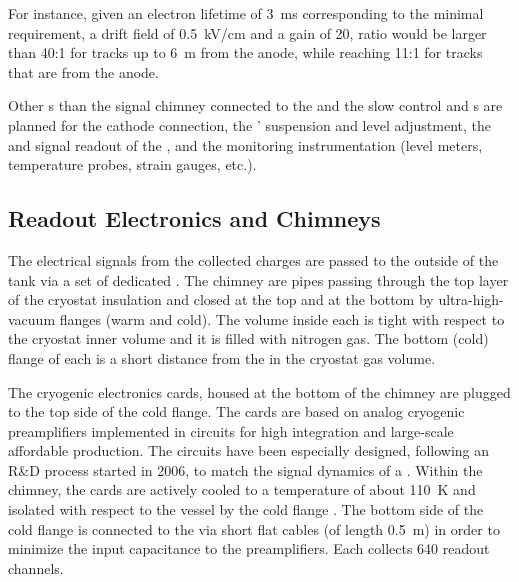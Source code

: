 For instance, given an electron lifetime of \SI{3}{ms} corresponding to the minimal requirement,  a drift field of \SI{0.5}{kV/cm} and a  gain of \num{20},  ratio would be larger than  \num{40}:\num{1} for tracks up to \SI{6}{m} from the anode, while reaching  \num{11}:\num{1} for   tracks that are \dpmaxdrift from the anode.


Other \fdth{}s than the signal chimney connected to the  and the  slow control and \fdth{}s are planned for the cathode  connection, the ' suspension and level adjustment, the  and signal readout of the , and the monitoring instrumentation (level meters, temperature probes, strain gauges, etc.).

\subsection{Readout Electronics and Chimneys}
\label{v4:fddp-ov:electronics}

The electrical signals from the collected charges are passed to the outside of the tank via a set of dedicated . The chimney are pipes passing through the top layer of the cryostat insulation and closed at the top and at the bottom by ultra-high-vacuum flanges (warm and cold). The volume inside each  is tight with respect to the cryostat inner volume and it is filled with nitrogen gas. The bottom (cold) flange of each  is a short distance %
from the  in the cryostat gas volume.

The cryogenic  electronics cards, housed at the bottom of the chimney are plugged to the top side of  the cold flange. The  cards are based on analog cryogenic preamplifiers implemented in   circuits for high integration and large-scale affordable production. 
The  circuits have been especially designed, following an R\&D process started in 2006, to match the signal dynamics of a . Within the chimney, the cards are actively cooled to a temperature of about \SI{110}{K} and isolated with respect to the \lar vessel by the cold flange \fdth{}.  The bottom side of the cold flange is connected to the  via short flat cables (of length \SI{0.5}{m}) in order to minimize the input capacitance to the preamplifiers. Each  collects \num{640} readout channels. 

